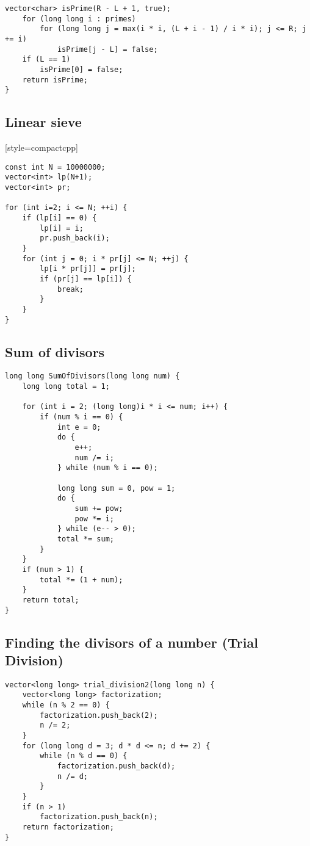 \documentclass[10pt]{article}
\begin{document}
\begin{multicols*}{2}
\begin{lstlisting}[style=compactcpp]
    vector<char> isPrime(R - L + 1, true);
    for (long long i : primes)
        for (long long j = max(i * i, (L + i - 1) / i * i); j <= R; j += i)
            isPrime[j - L] = false;
    if (L == 1)
        isPrime[0] = false;
    return isPrime;
}
\end{lstlisting}
\subsection{Linear sieve}[style=compactcpp]
\begin{lstlisting}
const int N = 10000000;
vector<int> lp(N+1);
vector<int> pr;

for (int i=2; i <= N; ++i) {
    if (lp[i] == 0) {
        lp[i] = i;
        pr.push_back(i);
    }
    for (int j = 0; i * pr[j] <= N; ++j) {
        lp[i * pr[j]] = pr[j];
        if (pr[j] == lp[i]) {
            break;
        }
    }
}
\end{lstlisting}

\subsection{Sum of divisors}

\begin{lstlisting}
long long SumOfDivisors(long long num) {
    long long total = 1;

    for (int i = 2; (long long)i * i <= num; i++) {
        if (num % i == 0) {
            int e = 0;
            do {
                e++;
                num /= i;
            } while (num % i == 0);

            long long sum = 0, pow = 1;
            do {
                sum += pow;
                pow *= i;
            } while (e-- > 0);
            total *= sum;
        }
    }
    if (num > 1) {
        total *= (1 + num);
    }
    return total;
}
\end{lstlisting}

\subsection{Finding the divisors of a number (Trial Division)}

\begin{lstlisting}[style=compactcpp]
vector<long long> trial_division2(long long n) {
    vector<long long> factorization;
    while (n % 2 == 0) {
        factorization.push_back(2);
        n /= 2;
    }
    for (long long d = 3; d * d <= n; d += 2) {
        while (n % d == 0) {
            factorization.push_back(d);
            n /= d;
        }
    }
    if (n > 1)
        factorization.push_back(n);
    return factorization;
}
\end{lstlisting}


\end{multicols*}
\end{document}
